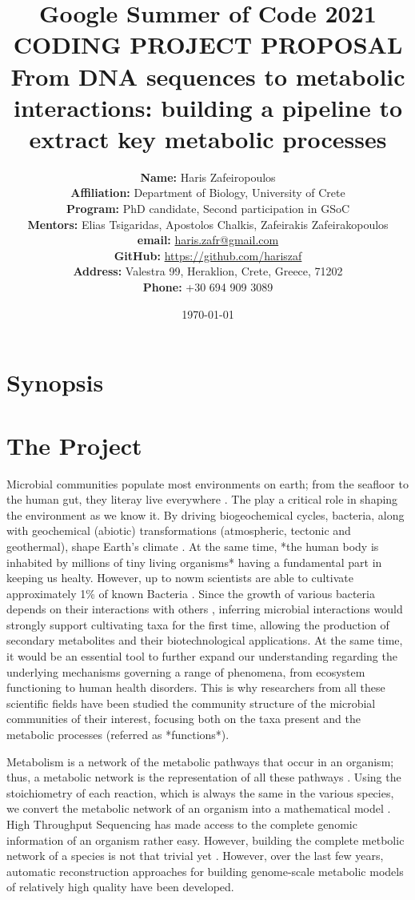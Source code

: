 \documentclass{article}
\title{Google Summer of Code 2021 \\ CODING PROJECT PROPOSAL \\ From DNA sequences to metabolic interactions: building a pipeline to extract key metabolic processes}
\author{
   \textbf{Name:} {Haris Zafeiropoulos} \\
   \textbf{Affiliation:} Department of Biology, University of Crete \\
   \textbf{Program:} PhD candidate, Second participation in GSoC \\
   \textbf{Mentors:} Elias Tsigaridas, Apostolos Chalkis, Zafeirakis Zafeirakopoulos \\
   \textbf{email:} \href{mailto:haris.zafr@gmail.com}{haris.zafr@gmail.com}\\
   \textbf{GitHub:} \href{https://github.com/hariszaf}{https://github.com/hariszaf}\\
   \textbf{Address:} Valestra 99, Heraklion, Crete, Greece, 71202\\
   \textbf{Phone:} +30 694 909 3089
}
\date{\today}
\begin{document}
\maketitle
\tableofcontents



\section{Synopsis}




\section{The Project}


Microbial communities populate most environments on earth; from the seafloor to the
human gut, they literay live everywhere \cite{reise2009item}.
The play a critical role in shaping the environment as we know it.  
By driving biogeochemical cycles, 
bacteria, along with geochemical (abiotic) transformations (atmospheric, tectonic and geothermal), shape Earth's climate \cite{falkowski2008microbial}.
At the same time, *the human body is inhabited by millions of tiny living organisms* 
having a fundamental part in keeping us healty\cite{da2017we}. 
However, up to nowm scientists are able to cultivate approximately 1\% of known Bacteria \cite{tang2019microbial}. 
Since the growth of various bacteria depends on their interactions with others \cite{wade2002unculturable}, inferring microbial interactions would strongly support cultivating taxa for the first time, allowing the production of secondary metabolites and their biotechnological applications.
At the same time, it would be an essential tool to further expand our understanding
regarding the underlying mechanisms governing a range of phenomena, from ecosystem 
functioning to human health disorders.
This is why researchers from all these scientific fields have been studied the 
community structure of the microbial communities of their interest, 
focusing both on the taxa present and the metabolic processes (referred as *functions*). 

Metabolism is a network of the metabolic pathways that occur in an organism; thus, a metabolic network is the representation of all these pathways \cite{palsson2015systems}.
Using the stoichiometry of each reaction, which is always the same in the various species,
we convert the metabolic network of an organism into a mathematical model \cite{palsson2015systems}.
High Throughput Sequencing has made access to the complete genomic information of an organism rather easy. 
However, building the complete metbolic network of a species is not that trivial yet \cite{thiele2010protocol}.
However, over the last few years, automatic reconstruction approaches for building genome-scale metabolic models \cite{machado2018fast} of relatively high quality have been developed.
\end{document}
